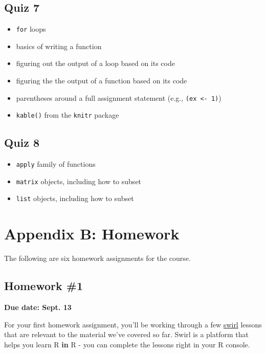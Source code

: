 \documentclass[]{book}
\providecommand{\tightlist}{%
  \setlength{\itemsep}{0pt}\setlength{\parskip}{0pt}}
\theoremstyle{definition}
\theoremstyle{definition}
\theoremstyle{definition}
\theoremstyle{remark}
\begin{document}
\section{Quiz 7}\label{quiz-7}

\begin{itemize}
\tightlist
\item
  \texttt{for} loops
\item
  basics of writing a function
\item
  figuring out the output of a loop based on its code
\item
  figuring the the output of a function based on its code
\item
  parentheses around a full assignment statement (e.g.,
  \texttt{(ex\ \textless{}-\ 1)})
\item
  \texttt{kable()} from the \texttt{knitr} package
\end{itemize}

\section{Quiz 8}\label{quiz-8}

\begin{itemize}
\tightlist
\item
  \texttt{apply} family of functions
\item
  \texttt{matrix} objects, including how to subset
\item
  \texttt{list} objects, including how to subset
\end{itemize}

\chapter{Appendix B: Homework}\label{appendix-b-homework}

The following are six homework assignments for the course.

\section{Homework \#1}\label{homework-1}

\textbf{Due date: Sept. 13}

For your first homework assignment, you'll be working through a few
\href{http://swirlstats.com/}{swirl} lessons that are relevant to the
material we've covered so far. Swirl is a platform that helps you learn
R \textbf{in} R - you can complete the lessons right in your R console.
\end{document}
